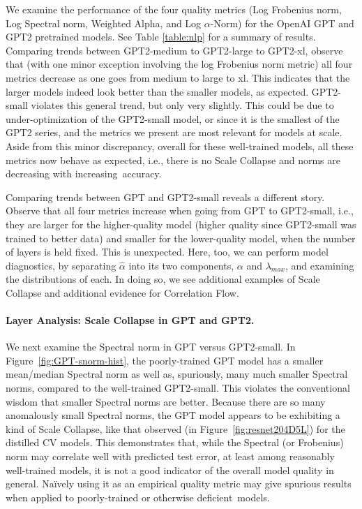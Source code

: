 We examine the performance of the four quality metrics (Log Frobenius norm, Log Spectral norm, Weighted Alpha, and Log $\alpha$-Norm) for the OpenAI GPT and GPT2 pretrained models.
See Table \ref{table:nlp} for a summary of results.
%
Comparing trends between GPT2-medium to GPT2-large to GPT2-xl,
observe that (with one minor exception involving the log Frobenius norm metric) all four metrics decrease as one goes from medium to large to xl.
This indicates that the larger models indeed look better than the smaller models, as expected.
GPT2-small violates this general trend, but only very slightly.
This could be due to under-optimization of the GPT2-small model, or since it is the smallest of the GPT2 series, and the metrics we present are most relevant for models at scale.
Aside from this minor discrepancy, overall for these well-trained models, all these metrics now behave as expected, i.e., there is no Scale Collapse and norms are decreasing with increasing~accuracy.

Comparing trends between GPT and GPT2-small reveals a different story. 
Observe that all four metrics increase when going from GPT to GPT2-small, i.e., they are larger for the higher-quality model (higher quality since GPT2-small was trained to better data) and smaller for the lower-quality model, when the number of layers is held fixed.
This is unexpected.
Here, too, we can perform model diagnostics, by separating $\hat{\alpha}$ into its two components, $\alpha$ and $\lambda_{max}$, and examining the distributions of each.
In doing so, we see additional examples of Scale Collapse and additional evidence for Correlation Flow.


\paragraph{Layer Analysis: Scale Collapse in GPT and GPT2.} 

We next examine the Spectral norm in GPT versus GPT2-small.
In Figure~\ref{fig:GPT-snorm-hist}, the poorly-trained GPT model has a smaller mean/median Spectral norm as well as, spuriously, many much smaller Spectral norms, compared to the well-trained GPT2-small.
This violates the conventional wisdom that smaller Spectral norms are better.
Because there are so many anomalously small Spectral norms, the GPT model appears to be exhibiting a kind of Scale Collapse, like that observed (in Figure~\ref{fig:resnet204D5L}) for the distilled CV models.
This demonstrates that, while the Spectral (or Frobenius) norm may correlate well with predicted test error, at least among reasonably well-trained models, it is not a good indicator of the overall model quality in general.
Na\"ively using it as an empirical quality metric may give spurious results when applied to poorly-trained or otherwise deficient~models. 


